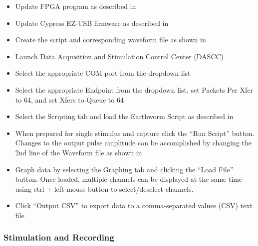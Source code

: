 \begin{itemize}

\item Update FPGA program as described in~\cite{BatzerMSEE}

\item Update Cypress EZ-USB firmware as described in~\cite{BatzerMSEE}

\item Create the script and corresponding waveform file as shown in~\cite{BatzerMSEE}

\item Launch Data Acquisition and Stimulation Control Center (DASCC)

\item Select the appropriate COM port from the dropdown list

\item Select the appropriate Endpoint from the dropdown list, set Packets Per Xfer to 64, and set Xfers to Queue to 64

\item Select the Scripting tab and load the Earthworm Script as described in~\cite{BatzerMSEE}

\item When prepared for single stimulus and capture click the ``Run Script'' button.  Changes to the output pulse amplitude can be accomplished by changing the 2nd line of the Waveform file as shown in~\cite{BatzerMSEE}

\item Graph data by selecting the Graphing tab and clicking the ``Load File'' button.  Once loaded, multiple channels can be displayed at the same time using ctrl + left mouse button to select/deselect channels.

\item Click ``Output CSV'' to export data to a comma-separated values (CSV) text file

\end{itemize}

\subsubsection{Stimulation and Recording}

